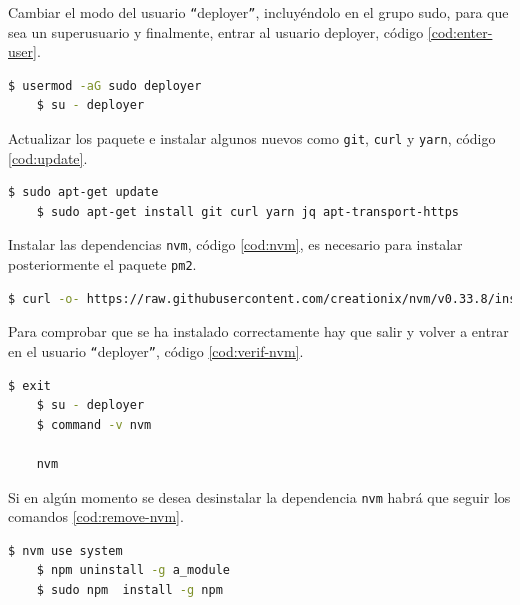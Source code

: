 Cambiar el modo del usuario \texttt{``{}}deployer\texttt{''}, incluyéndolo en el grupo sudo, para que sea un superusuario y finalmente, entrar al usuario deployer, código \ref{cod:enter-user}.\\

\begin{lstlisting}[language=Bash,caption=Instalación \textit{blockchain}. Parte III, label=cod:enter-user, style=Consola]
	$ usermod -aG sudo deployer
	$ su - deployer
\end{lstlisting}

Actualizar los paquete e instalar algunos nuevos como \texttt{git}, \texttt{curl} y \texttt{yarn}, código \ref{cod:update}.\\

\begin{lstlisting}[language=Bash,caption=Instalación \textit{blockchain}. Parte IV, label=cod:update, style=Consola]
	$ sudo apt-get update
	$ sudo apt-get install git curl yarn jq apt-transport-https
\end{lstlisting}

Instalar las dependencias \texttt{nvm}, código \ref{cod:nvm}, es necesario para instalar posteriormente el paquete \texttt{pm2}.\\

\begin{lstlisting}[language=Bash,caption=Instalación \textit{blockchain}. Parte V, label=cod:nvm, style=Consola]
	$ curl -o- https://raw.githubusercontent.com/creationix/nvm/v0.33.8/install.sh | bash
\end{lstlisting}

Para comprobar que se ha instalado correctamente hay que salir y volver a entrar en el usuario \texttt{``{}}deployer\texttt{''}, código \ref{cod:verif-nvm}.\\

\begin{lstlisting}[language=Bash,caption=Instalación \textit{blockchain}. Parte VI, label=cod:verif-nvm, style=Consola]
	$ exit
	$ su - deployer
	$ command -v nvm

	nvm
\end{lstlisting}

Si en algún momento se desea desinstalar la dependencia \texttt{nvm} habrá que seguir los comandos \ref{cod:remove-nvm}.

\begin{lstlisting}[language=Bash,caption=Instalación \textit{blockchain}. Parte VII, label=cod:remove-nvm, style=Consola]
	$ nvm use system
	$ npm uninstall -g a_module
	$ sudo npm  install -g npm
\end{lstlisting}

